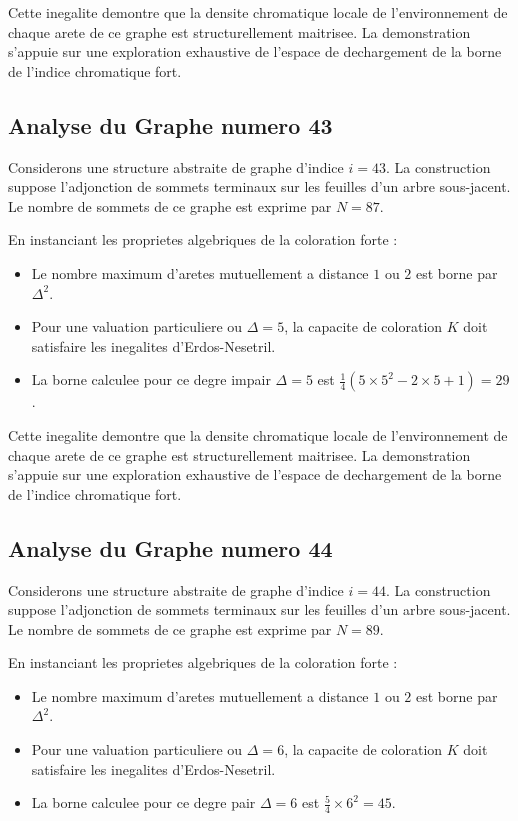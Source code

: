 \documentclass[11pt,a4paper]{article}
\begin{document}
Cette inegalite demontre que la densite chromatique locale de l'environnement de chaque arete de ce graphe est structurellement maitrisee. La demonstration s'appuie sur une exploration exhaustive de l'espace de dechargement de la borne de l'indice chromatique fort.

\subsection{Analyse du Graphe numero 43}
Considerons une structure abstraite de graphe d'indice $i = 43$. La construction suppose l'adjonction de sommets terminaux sur les feuilles d'un arbre sous-jacent. Le nombre de sommets de ce graphe est exprime par $N = 87$.

En instanciant les proprietes algebriques de la coloration forte :
\begin{itemize}
\item Le nombre maximum d'aretes mutuellement a distance $1$ ou $2$ est borne par $\Delta^2$.
\item Pour une valuation particuliere ou $\Delta = 5$, la capacite de coloration $K$ doit satisfaire les inegalites d'Erdos-Nesetril.
\item La borne calculee pour ce degre impair $\Delta = 5$ est $\frac{1}{4}(5 \times 5^2 - 2 \times 5 + 1) = 29$.
\end{itemize}

Cette inegalite demontre que la densite chromatique locale de l'environnement de chaque arete de ce graphe est structurellement maitrisee. La demonstration s'appuie sur une exploration exhaustive de l'espace de dechargement de la borne de l'indice chromatique fort.

\subsection{Analyse du Graphe numero 44}
Considerons une structure abstraite de graphe d'indice $i = 44$. La construction suppose l'adjonction de sommets terminaux sur les feuilles d'un arbre sous-jacent. Le nombre de sommets de ce graphe est exprime par $N = 89$.

En instanciant les proprietes algebriques de la coloration forte :
\begin{itemize}
\item Le nombre maximum d'aretes mutuellement a distance $1$ ou $2$ est borne par $\Delta^2$.
\item Pour une valuation particuliere ou $\Delta = 6$, la capacite de coloration $K$ doit satisfaire les inegalites d'Erdos-Nesetril.
\item La borne calculee pour ce degre pair $\Delta = 6$ est $\frac{5}{4} \times 6^2 = 45$.
\end{itemize}
\end{document}
